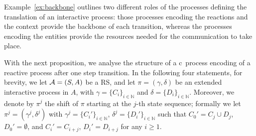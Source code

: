 %
%

Example~\ref{ex:backbone}   outlines two different roles of the processes defining the translation of an interactive process: those processes encoding the reactions and the context provide the backbone of each transition, whereas the processes encoding the entities provide the resources needed for the communication to take place.
 
With the next proposition, we analyse the structure of a c\CNA \ 
process encoding of  a reactive process after one step transition.
In the following four statements, for brevity, we let ${\cal A} = (S, A)$ be a RS, and let  $\pi=(\gamma,\delta)$ be an extended interactive process in $A$, with $\gamma=\{C_i\}_{i\in\mathbb{N}}$ and $\delta=\{D_i\}_{i\in\mathbb{N}}$. Moreover, we denote by $\pi^j$ the shift of $\pi$ starting at the $j$-th state sequence; formally we let $\pi^j=(\gamma^j,\delta^j)$ with
$\gamma^j=\{C_i'\}_{i\in\mathbb{N}}$, $\delta^j=\{D_i'\}_{i\in\mathbb{N}}$ such that 
$C_0'=C_j \cup D_j$, 
$D_0' = \emptyset$,
and   $C_i'=C_{i+j}$, $D_i'= D_{i+j}$ for any $i\geq 1$.


